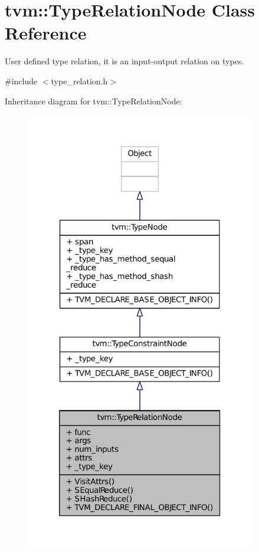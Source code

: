 \hypertarget{classtvm_1_1TypeRelationNode}{}\section{tvm\+:\+:Type\+Relation\+Node Class Reference}
\label{classtvm_1_1TypeRelationNode}


User defined type relation, it is an input-\/output relation on types.  




{\ttfamily \#include $<$type\+\_\+relation.\+h$>$}



Inheritance diagram for tvm\+:\+:Type\+Relation\+Node\+:
\nopagebreak
\begin{figure}[H]
\begin{center}
\leavevmode
\includegraphics[height=550pt]{classtvm_1_1TypeRelationNode__inherit__graph}
\end{center}
\end{figure}



